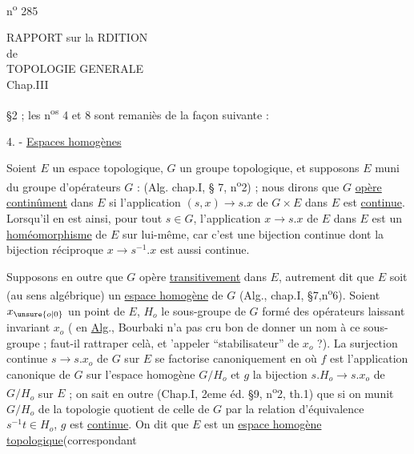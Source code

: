 
\hfill n\textsuperscript{o} 285

\begin{center}
RAPPORT sur la RDITION\\
de\\
TOPOLOGIE GENERALE\\
Chap.III
\end{center}

§2 ; les n\textsuperscript{os} 4 et 8 sont remaniès de la façon suivante :

4. - \uline{Espaces homogènes}

Soient $E$ un espace topologique, $G$ un groupe topologique, et supposons $E$ muni du groupe d'opérateurs $G$ : (Alg. chap.I, § 7, n\textsuperscript{o}2) ; nous dirons que $G$ \uline{opère continûment} dans $E$ si l'application $(s,x)\to s.x$ de $G\times E$ dans $E$ est \uline{continue}. Lorsqu'il en est ainsi, pour tout $s\in G$, l'application $x\longrightarrow s.x$ de $E$ dans $E$ est un \uline{homéomorphisme} de $E$ sur lui-même, car c'est une bijection continue dont la bijection réciproque $x\longrightarrow s^{-1}.x$ est aussi continue.

Supposons en outre que $G$ opère \uline{transitivement} dans $E$, autrement dit que $E$ soit (au sens algébrique) un \uline{espace homogène} de $G$ (Alg., chap.I, §7,n\textsuperscript{o}6). Soient $x_{\unsure{o|0}}$ un point de $E$, $H_o$ le sous-groupe de $G$ formé des opérateurs laissant invariant $x_o$ ( en \uline{Alg}., Bourbaki n'a pas cru bon de donner un nom à ce sous-groupe ; faut-il rattraper celà, et 'appeler ``stabilisateur'' de $x_o$ ?). La surjection continue $s\longrightarrow s.x_o$ de $G$ sur $E$ se factorise canoniquement en
où $f$ est l'application canonique de $G$ sur l'espace homogène $G/H_o$ et $g$ la bijection $s.H_o\to s.x_o$ de $G/H_o$ sur $E$ ; on sait en outre (Chap.I, 2eme éd. §9, n\textsuperscript{o}2, th.1) que si on munit $G/H_o$ de la topologie quotient de celle de $G$ par la relation d'équivalence $s^{-1}t\in H_o$, $g$ est \uline{continue}. On dit que $E$ est un \uline{espace homogène topologique}(correspondant
